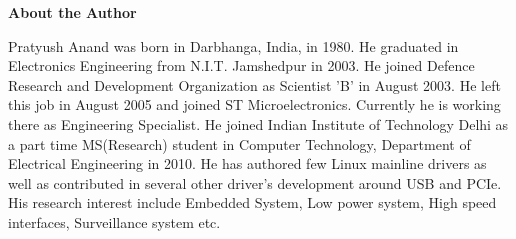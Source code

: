 \documentclass[a4paper, 12pt, twoside]{Thesis}  %
\begin{document}
\mainmatter	  %
\pagestyle{plain}  %







\label{Bibliography}
%
\cleardoublepage


\huge\textbf{About the Author}

\begin{sloppypar}
\normalsize
Pratyush Anand was born in Darbhanga, India, in 1980. He graduated in
Electronics Engineering from N.I.T. Jamshedpur in 2003. He joined
Defence Research and Development Organization as Scientist 'B' in August
2003. He left this job in August 2005 and joined ST Microelectronics.
Currently he is working there as Engineering Specialist. He joined
Indian Institute of Technology Delhi as a part time MS(Research) student
in Computer Technology, Department of Electrical Engineering in 2010. He
has authored few Linux mainline drivers as well as contributed in
several other driver’s development around USB and PCIe. His research
interest include Embedded System, Low power system, High speed
interfaces, Surveillance system etc.
\end{sloppypar}
\end{document}
